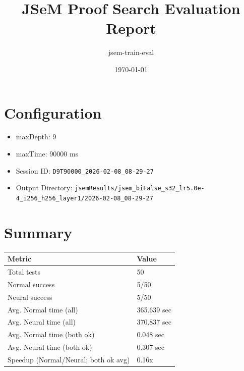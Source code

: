 \documentclass[a4paper,10pt]{article}
\title{JSeM Proof Search Evaluation Report}
\author{jsem-train-eval}
\date{\today}
\begin{document}
\maketitle

\section{Configuration}
\begin{itemize}
\item maxDepth: 9
\item maxTime: 90000 ms
\item Session ID: \texttt{D9T90000\_2026-02-08\_08-29-27}
\item Output Directory: \texttt{jsemResults/jsem\_biFalse\_s32\_lr5.0e-4\_i256\_h256\_layer1/2026-02-08\_08-29-27}
\end{itemize}

\section{Summary}
\begin{tabular}{ll}
\toprule
\textbf{Metric} & \textbf{Value} \\
\midrule
Total tests & 50 \\
Normal success & 5/50 \\
Neural success & 5/50 \\
\midrule
Avg. Normal time (all) & 365.639 sec \\
Avg. Neural time (all) & 370.837 sec \\
Avg. Normal time (both ok) & 0.048 sec \\
Avg. Neural time (both ok) & 0.307 sec \\
Speedup (Normal/Neural; both ok avg) & 0.16x \\
\bottomrule
\end{tabular}
\end{document}
